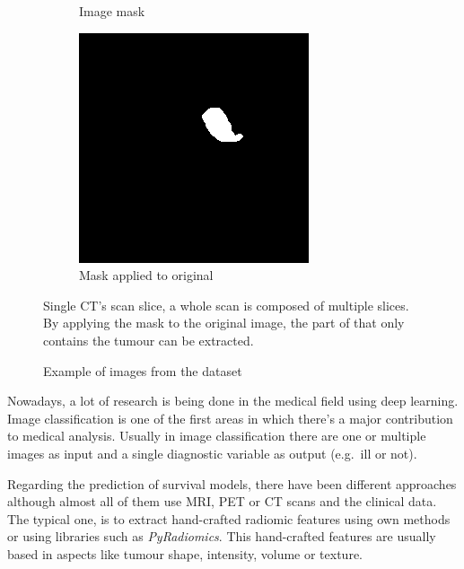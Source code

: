 \begin{figure}
\begin{subfigure}[t]{.32\textwidth}
    \caption{Image mask}
  \end{subfigure}
  \hfill
  \begin{subfigure}[t]{.32\textwidth}
    \centering
    \includegraphics[width=\textwidth]{images/IMG_merge_example.png}
    \caption{Mask applied to original}
  \end{subfigure}

  \caption{Example of images from the dataset \label{fig:dataset-example}}

  Single \gls{CT}'s scan slice, a whole scan is composed of multiple slices. By applying the mask to 
  the original image, the part of that only contains the tumour can be extracted.
\end{figure}



Nowadays, a lot of research is being done in the medical field using deep learning. Image
classification is one of the first areas in which there's a major contribution to medical analysis.
Usually in image classification there are one or multiple images as input and a single diagnostic 
variable as output (e.g.~ill or not).
~\cite{medical:survey-deep-learning}

Regarding the prediction of survival models, there have been different approaches although
almost all of them use \gls{MRI}, \gls{PET} or \gls{CT} scans and the clinical data. 
The typical one, is to extract hand-crafted radiomic features using own methods or using 
libraries such as \emph{PyRadiomics}. This 
hand-crafted features are usually based in aspects like tumour shape, intensity, volume or texture.
~\cites{medical:tumour-radiomics}{medical:py-radiomics}{medical:computational-radiomics}

